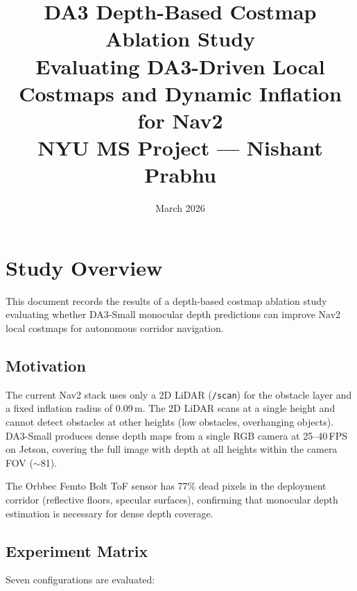 \documentclass[11pt,a4paper]{article}
\title{%
  \textbf{DA3 Depth-Based Costmap Ablation Study} \\[0.5em]
  \large Evaluating DA3-Driven Local Costmaps and Dynamic Inflation for Nav2 \\[0.3em]
  \normalsize NYU MS Project --- Nishant Prabhu
}
\author{}
\date{March 2026}
\begin{document}
\maketitle
\tableofcontents
\newpage

\section{Study Overview}

This document records the results of a depth-based costmap ablation study
evaluating whether DA3-Small monocular depth predictions can improve Nav2
local costmaps for autonomous corridor navigation.

\subsection{Motivation}

The current Nav2 stack uses only a 2D LiDAR (\texttt{/scan}) for the
obstacle layer and a fixed inflation radius of 0.09\,m. The 2D LiDAR
scans at a single height and cannot detect obstacles at other heights
(low obstacles, overhanging objects). DA3-Small produces dense depth maps
from a single RGB camera at 25--40\,FPS on Jetson, covering the full
image with depth at all heights within the camera FOV ($\sim$81\textdegree{}).

The Orbbec Femto Bolt ToF sensor has 77\% dead pixels in the deployment
corridor (reflective floors, specular surfaces), confirming that monocular
depth estimation is necessary for dense depth coverage.

\subsection{Experiment Matrix}

Seven configurations are evaluated:
\end{document}
